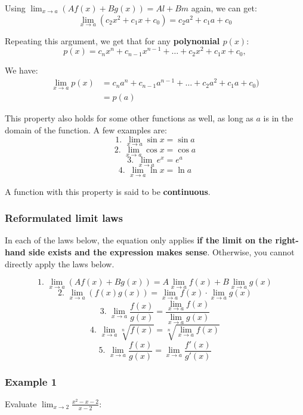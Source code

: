 \documentclass[11pt]{article}
\begin{document}
Using \(\lim_{x \rightarrow a}(Af(x) + Bg(x)) = Al + Bm\) again, we can get:
\[\lim_{x \rightarrow a}(c_2 x^2 + c_1 x + c_0) = c_2 a^2 + c_1 a + c_0\]

Repeating this argument, we get that for any \textbf{polynomial \(p(x)\)}:
\[p(x) = c_n x^n + c_{n - 1} x^{n - 1} + \ldots + c_2 x^2 + c_1 x + c_0,\]

We have:
\begin{align*}
\lim_{x \rightarrow a}p(x) &= c_n a^n + c_{n - 1} a^{n-1} + \ldots + c_2 a^2 + c_1 a + c_0) \\
&= p(a)
\end{align*}

This property also holds for some other functions as well, as long as \(a\) is in the domain of the function. A few examples are:
\[\text{1. } \lim_{x \rightarrow a} \sin x = \sin a\]
\[\text{2. } \lim_{x \rightarrow a} \cos x = \cos a\]
\[\text{3. } \lim_{x \rightarrow a}  e^x = e^a\]
\[\text{4. } \lim_{x \rightarrow a}  \ln x = \ln a\]

A function with this property is said to be \textbf{continuous}.

\subsubsection{Reformulated limit laws}
\label{sec:org0c034de}
In each of the laws below, the equation only applies \textbf{if the limit on the right-hand side exists and the expression makes sense}. Otherwise, you cannot directly apply the laws below.

\[\text{1. }\lim_{x \rightarrow a}(Af(x) + Bg(x)) = A \lim_{x \rightarrow a}f(x) + B \lim_{x \rightarrow a} g(x)\]
\[\text{2. } \lim_{x \rightarrow a}(f(x) g(x)) = \lim_{x \rightarrow a} f(x) \cdot \lim_{x \rightarrow a} g(x)\]
\[\text{3. } \lim_{x \rightarrow a} \frac{f(x)}{g(x)} = \frac{\lim_{x \rightarrow a} f(x)}{\lim_{x \rightarrow a} g(x)}\]
\[\text{4. } \lim_{x \rightarrow a} \sqrt[n]{f(x)} = \sqrt[n]{\lim_{x \rightarrow a} f(x)}\]
\[\text{5. } \lim_{x \rightarrow a} \frac{f(x)}{g(x)} = \lim_{x \rightarrow a} \frac{f'(x)}{g'(x)}\]


\newpage

\subsubsection{Example 1}
\label{sec:orgd69f537}

Evaluate \(\lim_{x \rightarrow 2} \frac{x^2 - x - 2}{x - 2}\):
\end{document}
